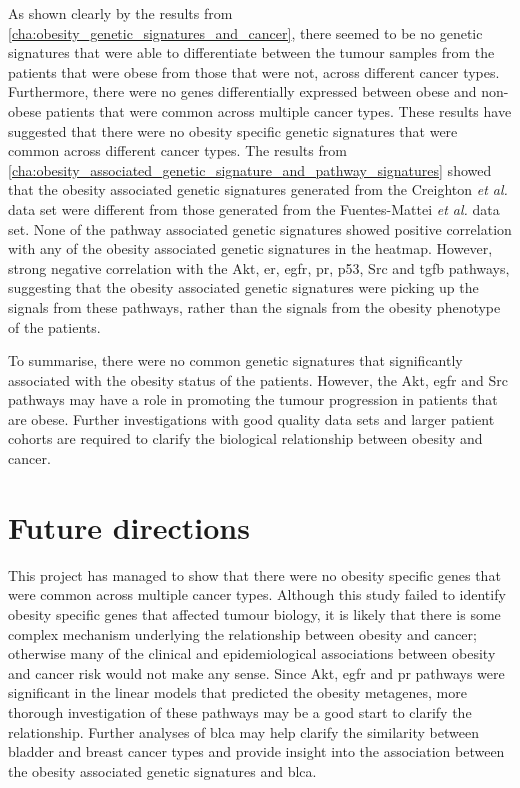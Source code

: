As shown clearly by the results from \cref{cha:obesity_genetic_signatures_and_cancer}, there seemed to be no  genetic signatures that were able to differentiate between the tumour samples from the patients that were obese from those that were not, across different cancer types.
Furthermore, there were no genes differentially expressed between obese and non-obese patients that were common across multiple cancer types.
These results have suggested that there were no obesity specific genetic signatures that were common across different cancer types.
The results from \cref{cha:obesity_associated_genetic_signature_and_pathway_signatures} showed that the obesity associated genetic signatures generated from the Creighton \textit{et al.} data set were different from those generated from the Fuentes-Mattei \textit{et al.} data set.
None of the pathway associated genetic signatures showed positive correlation with any of the obesity associated genetic signatures in the heatmap.
However, strong negative correlation with the Akt, \gls{er}, \gls{egfr}, \gls{pr}, p53, Src and \gls{tgfb} pathways, suggesting that the obesity associated genetic signatures were picking up the signals from these pathways, rather than the signals from the obesity phenotype of the patients.

To summarise, there were no common genetic signatures that significantly associated with the obesity status of the patients.
However, the Akt, \gls{egfr} and Src pathways may have a role in promoting the tumour progression in patients that are obese.
Further investigations with good quality data sets and larger patient cohorts are required to clarify the biological relationship between obesity and cancer.

\section{Future directions}
\label{sec:future_directions}

This project has managed to show that there were no obesity specific genes  that were common across multiple cancer types.
Although this study failed to identify obesity specific genes that affected tumour biology, it is likely that there is some complex mechanism underlying the relationship between obesity and cancer; otherwise many of the clinical and epidemiological associations between obesity and cancer risk would not make any sense.
Since Akt, \gls{egfr} and \gls{pr} pathways were significant in the linear models that predicted the obesity metagenes, more thorough investigation of these pathways may be a good start to clarify the relationship.
Further analyses of \gls{blca} may help clarify the similarity between bladder and breast cancer types and provide insight into the association between the obesity associated genetic signatures and \gls{blca}.

